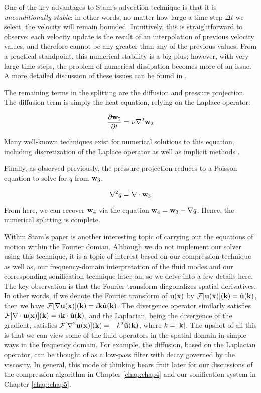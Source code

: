 One of the key advantages to Stam's advection technique is that it is {\em unconditionally stable}: in other words, no matter how large a time step $\Delta t$ we select, the velocity will remain bounded. Intuitively, this is straightforward to observe: each velocity update is the result of an interpolation of previous velocity values, and therefore cannot be any greater than any of the previous values. From a practical standpoint, this numerical stability is a big plus; however, with very large time steps, the problem of numerical dissipation becomes more of an issue. A more detailed discussion of these issues can be found in \cite{bridson2015fluid}.

The remaining terms in the splitting are the diffusion and pressure projection. The diffusion term is simply the heat equation, relying on the Laplace operator:

\begin{equation}
\frac{\partial{\mathbf{w}_2}}{\partial{t}} = \nu \nabla^2 \mathbf{w}_2
\end{equation}

Many well-known techniques exist for numerical solutions to this equation, including discretization of the Laplace operator as well as implicit methods \cite{peaceman1955numerical}.

Finally, as observed previously, the pressure projection reduces to a Poisson equation to solve for $q$ from $\mathbf{w}_3$.

\begin{equation}
\nabla^2 q = \nabla \cdot \mathbf{w}_3
\end{equation}

From here, we can recover $\mathbf{w}_4$ via the equation $\mathbf{w}_4 = \mathbf{w}_3 - \nabla q$. Hence, the numerical splitting is complete.

Within Stam's paper is another interesting topic of carrying out the equations of motion within the Fourier domian. Although 
we do not implement our solver using this technique, it is a topic of interest based on our compression technique as well as,
our frequency-domain interpretation of the fluid modes and our corresponding sonification technique later on, so we delve into a few details here. The key observation is that the Fourier transform diagonalizes spatial derivatives. In other words, if we denote the Fourier transform of $\mathbf{u}(\mathbf{x})$ by $\mathcal{F}[\mathbf{u}(\mathbf{x})](\mathbf{k}) = \hat{\mathbf{u}}(\mathbf{k})$, then we have $\mathcal{F}[\nabla \mathbf{u}(\mathbf{x})](\mathbf{k}) = i \mathbf{k} \hat{\mathbf{u}}(\mathbf{k})$. The divergence operator similarly satisfies $\mathcal{F}[\nabla \cdot \mathbf{u}(\mathbf{x})](\mathbf{k}) = i \mathbf{k} \cdot \hat{\mathbf{u}}(\mathbf{k})$, and the Laplacian, being the divergence of the gradient, satisfies $\mathcal{F}[\nabla^2 \mathbf{u}(\mathbf{x})](\mathbf{k}) = - k^2 \hat{\mathbf{u}}(\mathbf{k})$, where $k = |\mathbf{k}|$. The upshot of all this is that we can view some of the fluid operators in the spatial domain in simple ways in the frequency domain. For example, the diffusion, based on the Laplacian operator, can be thought of as a low-pass filter with decay governed by the viscosity. In general, this mode of
thinking bears fruit later for our discussions of the compression algorithm in Chapter \ref{chap:chap4} and our sonification system in Chapter \ref{chap:chap5}.

